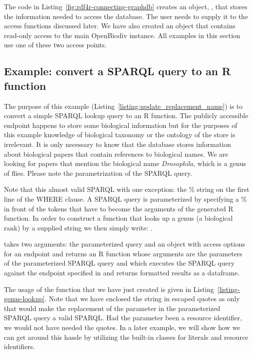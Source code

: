 The code in Listing~\ref{fig:rdf4r-connecting-graphdb} creates an object, , that stores the information needed to access the database. The user needs to supply it to the access functions discussed later. We have also created an object  that contains read-only access to the main OpenBiodiv instance. All examples in this section use one of these two access points.



\subsection{Example: convert a SPARQL query to an R function}

The purpose of this example (Listing~\ref{listing:update_replacement_name}) is to convert a simple SPARQL lookup query to an R function. The publicly accessible endpoint happens to store some biological information but for the purposes of this example knowledge of biological taxonomy or the ontology of the store is irrelevant. It is only necessary to know that the database stores information about biological papers that contain references to biological names. We are looking for papers that mention the biological name \emph{Drosophila}, which is a genus of flies. Please note the parametrization of the SPARQL query.


Note that this almost valid SPARQL with one exception: the \% string on the first line of the WHERE clause. A SPARQL query is parameterized by specifying a \% in front of the tokens that have to become the arguments of the generated R function. In order to construct a function that looks up a genus (a biological rank) by a supplied string we then simply write: .

 takes two arguments: the parameterized query and an object with access options for an endpoint and returns an R function whose arguments are the parameters of the parameterized SPARQL query and which executes the SPARQL query against the endpoint specified in  and returns formatted results as a dataframe.

The usage of the function that we have just created is given in Listing~\ref{listing-genus-lookup}. Note that we have enclosed the string  in escaped quotes as only that would make the replacement of the parameter in the parameterized SPARQL query a valid SPARQL. Had the parameter been a resource identifier, we would not have needed the quotes. In a later example, we will show how we can get around this hassle by utilizing the built-in classes for literals and resource identifiers.

